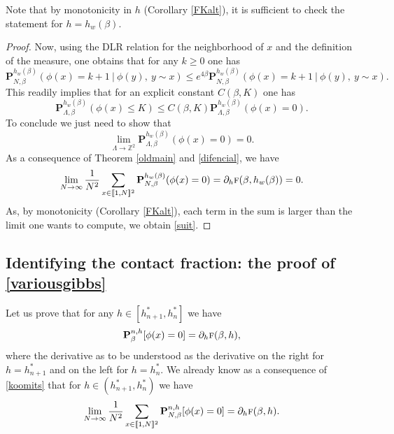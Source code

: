 \documentclass[JEP,XML,SOM,Unicode, NoFloatCountersInSection]{cedram}
\numberwithin{equation}{section}
\theoremstyle{plain}
\theoremstyle{definition}
\newcommand{\lint}{\llbracket}
\newcommand{\rint}{\rrbracket}
\newcommand{\bP}{{\ensuremath{\mathbf P}} }
\newcommand{\bbZ}{{\ensuremath{\mathbb Z}} }
\newcommand{\gb}{\beta}
\newcommand{\gL}{\Lambda}
\newcommand{\tf}{\textsc{f}}
\begin{document}
Note that by monotonicity in $h$ (Corollary \ref{FKalt}), it is sufficient to check the statement for $h=h_w(\gb)$.

\begin{proof}
Now, using the DLR relation for the neighborhood of $x$ and the definition of the measure, one obtains that for any $k\ge 0$ one has
\begin{equation*}
\bP^{h_w(\gb)}_{N,\gb}(\phi(x)=k+1 \ | \ \phi(y),\ y\sim x)\le e^{4\gb} \bP^{h_w(\gb)}_{N,\gb}(\phi(x)=k+1 \ | \ \phi(y),\ y\sim x).
\end{equation*}
This readily implies that for an explicit constant $C(\gb,K)$ one has
\begin{equation*}
\bP^{h_w(\gb)}_{\gL,\gb}(\phi(x)\le K)\le C(\gb,K) \bP^{h_w(\gb)}_{\gL,\gb}(\phi(x)=0).
\end{equation*}
To conclude we just need to show that
\begin{equation}\label{suit}
\lim_{\gL \to \bbZ^2}\bP^{h_w(\gb)}_{\gL,\gb}(\phi(x)=0)=0.
\end{equation}
As a consequence of Theorem \ref{oldmain} and \eqref{difencial},
we have
\begin{equation*}
\lim_{N\to \infty} \frac{1}{N^2}\sum_{x\in \lint 1,N\rint^2} \bP^{h_w(\gb)}_{N,\gb}(\phi(x)=0)=\partial_h \tf(\gb,h_w(\gb))=0.
\end{equation*}
As, by monotonicity (Corollary \ref{FKalt}), each term in the sum is larger than the limit one wants to compute, we obtain \eqref{suit}.
\end{proof}

\subsection{Identifying the contact fraction: the proof of \eqref{variousgibbs}}\label{cf}

Let us prove that for any $h\in [h^*_{n+1},h^*_n]$ we have
\begin{equation}\label{wootz}
\bP^{n,h}_{\gb}[\phi(x)=0]=\partial_h \tf(\gb,h),
\end{equation}
where the derivative as to be understood as the derivative on the right for $h=h^*_{n+1}$ and on the left for
$h=h^*_{n}$.
We already know as a consequence of \eqref{koomits} that for $h\in(h^*_{n+1},h^*_n)$ we have
\begin{equation}\label{zeone}
\lim_{N\to \infty} \frac{1}{N^2}\sum_{x\in \lint 1,N \rint^2 }\bP^{n,h}_{N,\gb}[\phi(x)=0]=\partial_h \tf(\gb,h).
\end{equation}
\end{document}
